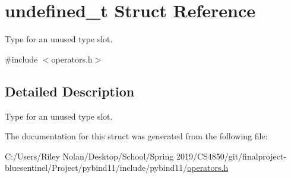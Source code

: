 \hypertarget{structundefined__t}{}\section{undefined\+\_\+t Struct Reference}
\label{structundefined__t}


Type for an unused type slot.  




{\ttfamily \#include $<$operators.\+h$>$}



\subsection{Detailed Description}
Type for an unused type slot. 

The documentation for this struct was generated from the following file\+:\begin{DoxyCompactItemize}
\item 
C\+:/\+Users/\+Riley Nolan/\+Desktop/\+School/\+Spring 2019/\+C\+S4850/git/finalproject-\/bluesentinel/\+Project/pybind11/include/pybind11/\mbox{\hyperlink{operators_8h}{operators.\+h}}\end{DoxyCompactItemize}
